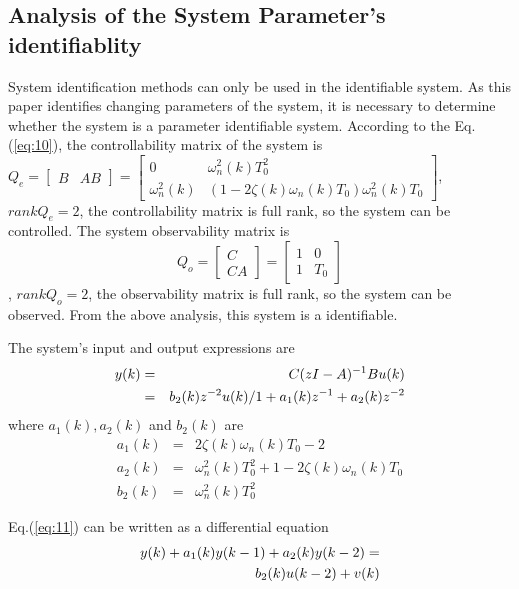\documentclass{article}
\begin{document}
\subsection{Analysis of the System Parameter's identifiablity}

System identification methods can only be used in the identifiable
system. As this paper identifies changing parameters of the system,
it is necessary to determine whether the system is a parameter
identifiable system. According to the Eq.(\ref{eq:10}),
the controllability matrix of the system is
$Q_e=
\begin{bmatrix}
  B   &   AB
\end{bmatrix}=
\begin{bmatrix}
  0             &   \omega^2_n(k)T^2_0   \\
  \omega^2_n(k) &   (1-2\zeta(k)\omega_n(k)T_0)\omega^2_n(k)T_0
\end{bmatrix}$,
$rank{}Q_e=2$, the controllability matrix is full rank, so the system
can be controlled. The system observability matrix is
$$Q_o =
\begin{bmatrix}
  C \\
  CA
\end{bmatrix} =
\begin{bmatrix}
  1  &  0  \\
  1  &  T_0
\end{bmatrix}$$,
$rank{}Q_o=2$, the observability matrix is full rank, so the system can
be observed. From the above analysis, this system is a identifiable.


The system's input and output expressions are
\begin{eqnarray}
  y(k) &=& C(zI-A)^{-1}B{}u(k)   \notag\\
       &=& b_2(k)z^{-2}u(k)/1 + a_1(k)z^{-1} + a_2(k)z^{-2} \label{eq:11}
\end{eqnarray}
where $a_1(k), a_2(k)$ and $b_2(k)$ are
\begin{eqnarray}
  a_1(k) &=&  2\zeta(k)\omega_n(k)T_0-2    \label{eq:12}\\
  a_2(k) &=&  \omega^2_n(k)T^2_0 + 1 - 2\zeta(k)\omega_n(k)T_0 \label{eq:13} \\
  b_2(k) &=&  \omega^2_n(k)T^2_0 \label{eq:14}
\end{eqnarray}

Eq.(\ref{eq:11}) can be written as a differential equation
\begin{eqnarray}
  y(k) + a_1(k)y(k-1) + a_2(k)y(k-2) = \notag\\
  b_2(k)u(k-2) + v(k)            \label{eq:15}
\end{eqnarray}
\end{document}
